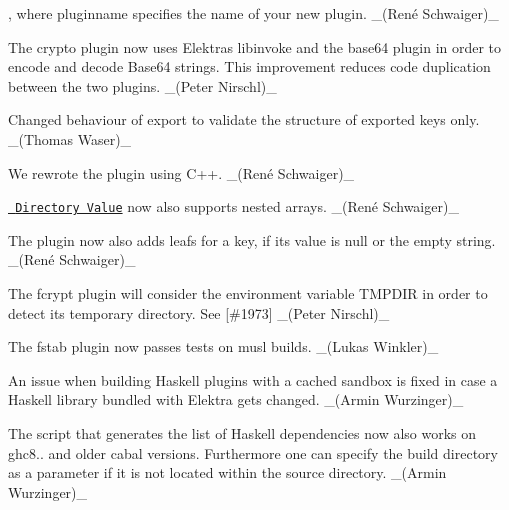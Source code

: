 , where {\ttfamily pluginname} specifies the name of your new plugin. \+\_\+(René Schwaiger)\+\_\+


\begin{DoxyItemize}
\item The {\ttfamily crypto} plugin now uses Elektra\textquotesingle{}s {\ttfamily libinvoke} and the {\ttfamily base64} plugin in order to encode and decode Base64 strings. This improvement reduces code duplication between the two plugins. \+\_\+(\+Peter Nirschl)\+\_\+
\end{DoxyItemize}


\begin{DoxyItemize}
\item Changed behaviour of export to validate the structure of exported keys only. \+\_\+(\+Thomas Waser)\+\_\+
\end{DoxyItemize}


\begin{DoxyItemize}
\item We rewrote the plugin using C++. \+\_\+(René Schwaiger)\+\_\+
\item \href{https://www.libelektra.org/plugins/directoryvalue}{\texttt{ Directory Value}} now also supports nested arrays. \+\_\+(René Schwaiger)\+\_\+
\item The plugin now also adds leafs for a key, if its value is null or the empty string. \+\_\+(René Schwaiger)\+\_\+
\end{DoxyItemize}


\begin{DoxyItemize}
\item The {\ttfamily fcrypt} plugin will consider the environment variable {\ttfamily T\+M\+P\+D\+IR} in order to detect its temporary directory. See \mbox{[}\#1973\mbox{]} \+\_\+(\+Peter Nirschl)\+\_\+
\end{DoxyItemize}


\begin{DoxyItemize}
\item The {\ttfamily fstab} plugin now passes tests on musl builds. \+\_\+(\+Lukas Winkler)\+\_\+
\end{DoxyItemize}


\begin{DoxyItemize}
\item An issue when building Haskell plugins with a cached sandbox is fixed in case a Haskell library bundled with Elektra gets changed. \+\_\+(\+Armin Wurzinger)\+\_\+
\item The script that generates the list of Haskell dependencies now also works on ghc8.. and older cabal versions. Furthermore one can specify the build directory as a parameter if it is not located within the source directory. \+\_\+(\+Armin Wurzinger)\+\_\+
\end{DoxyItemize}


